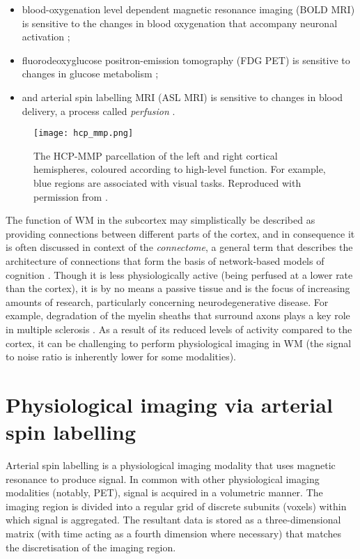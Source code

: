 \begin{itemize}

\item blood-oxygenation level dependent magnetic resonance imaging (BOLD MRI) is sensitive to the changes in blood oxygenation that accompany neuronal activation \cite{Jenkinson2017a}; 

\item fluorodeoxyglucose positron-emission tomography (FDG PET) is sensitive to changes in glucose metabolism \cite{Bohnen2013}; 

\item and arterial spin labelling MRI (ASL MRI) is sensitive to changes in blood delivery, a process called \textit{perfusion} \cite{Alsop2015}.  

\end{itemize}
 
\begin{figure}
\centering
\texttt{[image: hcp\_mmp.png]}
\caption{The HCP-MMP parcellation of the left and right cortical hemispheres, coloured according to high-level function. For example, blue regions are associated with visual tasks. Reproduced with permission from \cite{hcp_mmp}.}
\label{fig_hcp_mmp}
\end{figure}

The function of WM in the subcortex may simplistically be described as providing connections between different parts of the cortex, and in consequence it is often discussed in context of the \textit{connectome}, a general term that describes the architecture of connections that form the basis of network-based models of cognition \cite{Sporns2005}. Though it is less physiologically active (being perfused at a lower rate than the cortex), it is by no means a passive tissue and is the focus of increasing amounts of research, particularly concerning neurodegenerative disease. For example, degradation of the myelin sheaths that surround axons plays a key role in multiple sclerosis \cite{Shafee2015}. As a result of its reduced levels of activity compared to the cortex, it can be challenging to perform physiological imaging in WM (the signal to noise ratio is inherently lower for some modalities). 

\section{Physiological imaging via arterial spin labelling}

Arterial spin labelling is a physiological imaging modality that uses magnetic resonance to produce signal. In common with other physiological imaging modalities (notably, PET), signal is acquired in a volumetric manner. The imaging region is divided into a regular grid of discrete subunits (voxels) within which signal is aggregated. The resultant data is stored as a three-dimensional matrix (with time acting as a fourth dimension where necessary) that matches the discretisation of the imaging region.
 
